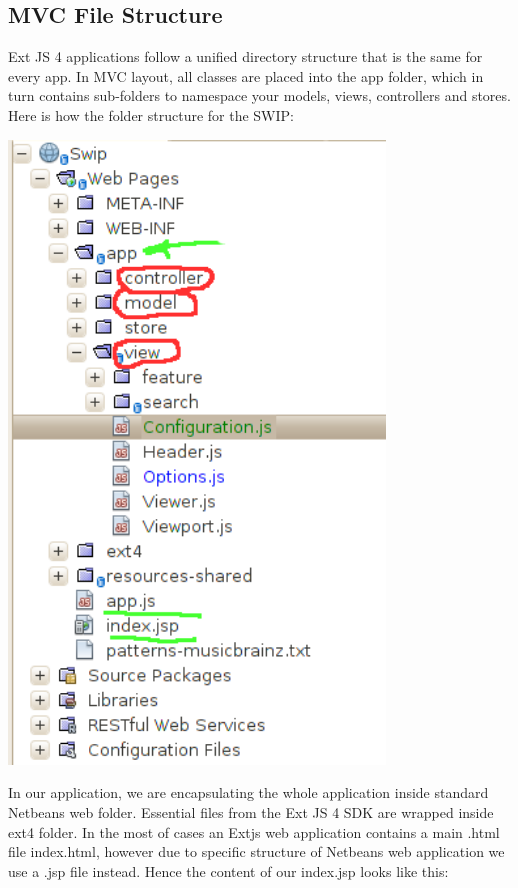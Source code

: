 \subsection{MVC File Structure}
\par Ext JS 4 applications follow a unified directory structure that is the same for every app. In MVC layout, all classes are placed into the app folder, which in turn contains sub-folders to namespace your models, views, controllers and stores. Here is how the folder structure for the SWIP:
\begin{center}
	\includegraphics[width=0.75\textwidth]{img/sencha-mvc.png}
\end{center}
In our application, we are encapsulating the whole application inside standard Netbeans web folder. Essential files from the Ext JS 4 SDK are wrapped inside ext4 folder. In the most of cases an Extjs web application contains a main .html file index.html, however due to specific structure of Netbeans web application we use a .jsp file instead. Hence the content of our index.jsp looks like this: \\

